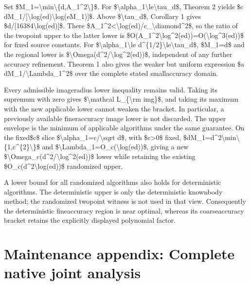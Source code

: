 \documentclass[10pt,a4paper]{article}
\begin{document}
Set \$M\_1=\textbackslash{}min\textbackslash{}\{d,A\_1\textasciicircum{}2\textbackslash{}\}\$. For \$\textbackslash{}alpha\_1\textbackslash{}le\textbackslash{}tau\_d\$, Theorem 2 yields \$c dM\_1/[\textbackslash{}log(ed)\textbackslash{}log(eM\_1)]\$. Above \$\textbackslash{}tau\_d\$, Corollary 1 gives \$d/[16384\textbackslash{}log(ed)]\$. There \$A\_1\textasciicircum{}2<\textbackslash{}log(ed)/c\_\textbackslash{}diamond\textasciicircum{}2\$, so the ratio of the twopoint upper to the latter lower is \$O(A\_1\textasciicircum{}2\textbackslash{}log\textasciicircum{}2(ed))=O(\textbackslash{}log\textasciicircum{}3(ed))\$ for fixed source constants. For \$\textbackslash{}alpha\_1\textbackslash{}le d\textasciicircum{}\{1/2\}\textbackslash{}le\textbackslash{}tau\_d\$, \$M\_1=d\$ and the regional lower is \$\textbackslash{}Omega(d\textasciicircum{}2/\textbackslash{}log\textasciicircum{}2(ed))\$, independent of any further accuracy refinement. Theorem 1 also gives the weaker but uniform expression \$a dM\_1/\textbackslash{}Lambda\_1\textasciicircum{}2\$ over the complete stated smallaccuracy domain.

Every admissible imageradius lower inequality remains valid. Taking its supremum with zero gives \$\textbackslash{}mathcal L\_\{\textbackslash{}rm img\}\$, and taking its maximum with the new applicable lower cannot weaken the bracket. In particular, a previously available fineraccuracy image lower is not discarded. The upper envelope is the minimum of applicable algorithms under the same guarantee. On the fixed\$c\$ slice \$\textbackslash{}alpha\_1=c/\textbackslash{}sqrt d\$, with \$c>0\$ fixed, \$dM\_1=d\textasciicircum{}2\textbackslash{}min\textbackslash{}\{1,c\textasciicircum{}\{2\}\textbackslash{}\}\$ and \$\textbackslash{}Lambda\_1=O\_c(\textbackslash{}log(ed))\$, giving a new \$\textbackslash{}Omega\_c(d\textasciicircum{}2/\textbackslash{}log\textasciicircum{}2(ed))\$ lower while retaining the existing \$O\_c(d\textasciicircum{}2\textbackslash{}log(ed))\$ randomized upper.

A lower bound for all randomized algorithms also holds for deterministic algorithms. The deterministic upper is only the deterministic knownbody method; the randomized twopoint witness is not used in that view. Consequently the deterministic fineaccuracy region is near optimal, whereas its coarseaccuracy bracket retains the explicitly displayed polynomial factor.


\section{Maintenance appendix: Complete native joint analysis}
\end{document}

